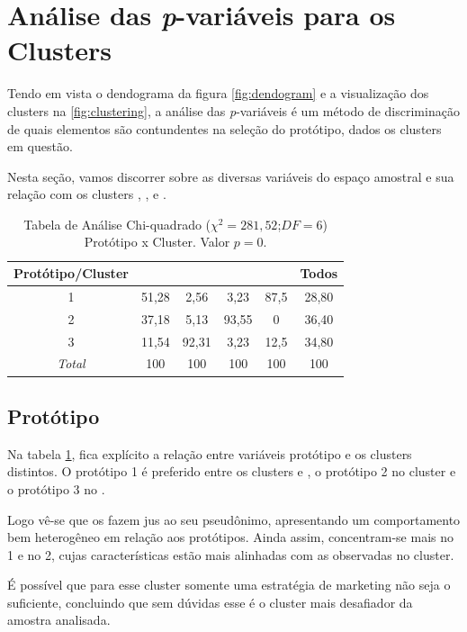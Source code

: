 \section{Análise das \emph{p}-variáveis para os Clusters}

Tendo em vista o dendograma da figura \ref{fig:dendogram} e a visualização dos
clusters na \ref{fig:clustering}, a análise das \emph{p}-variáveis é um método
de discriminação de quais elementos são contundentes na seleção do protótipo,
dados os clusters em questão. 

Nesta seção, vamos discorrer sobre as diversas variáveis do espaço
amostral e sua relação com os clusters \emph{\nomeCa{}}, \emph{\nomeCb{}}, \emph{\nomeCc{}}
e \emph{\nomeCd{}}.
\begin{table}
\begin{centering}
\begin{tabular}{c|c|c|c|c|c}
\hline 
Protótipo/Cluster & \nomeCa{} & \nomeCb{} & \nomeCc{} & \nomeCd{} & Todos\tabularnewline
\hline 
1 & 51,28 & 2,56 & 3,23 & 87,5 & 28,80\tabularnewline
\hline 
2 & 37,18 & 5,13 & 93,55 & 0 & 36,40\tabularnewline
\hline 
3 & 11,54 & 92,31 & 3,23 & 12,5 & 34,80\tabularnewline
\hline 
\emph{Total} & 100 & 100 & 100 & 100 & 100\tabularnewline
\hline 
\end{tabular}
\par\end{centering}

\caption{\label{tab:prototipo-vs-cluster}Tabela de Análise Chi-quadrado ($\chi^{2}=281,52$;$DF=6$)
Protótipo x Cluster. Valor $p=0$.}
\end{table}

\subsection{Protótipo}

Na tabela \ref{tab:prototipo-vs-cluster}, fica explícito a relação
entre variáveis protótipo e os clusters distintos. O protótipo 1 é
preferido entre os clusters \emph{\nomeCa{}} e \emph{\nomeCd{}},
o protótipo 2 no cluster \emph{\nomeCc{}} e o protótipo 3 no \emph{\nomeCb{}}.

Logo vê-se que os \emph{\nomeCa{}} fazem jus ao seu pseudônimo, apresentando
um comportamento bem heterogêneo em relação aos protótipos. Ainda
assim, concentram-se mais no 1 e no 2, cujas características estão
mais alinhadas com as observadas no cluster. 

É possível que para esse cluster somente uma estratégia de marketing
não seja o suficiente, concluindo que sem dúvidas esse é o cluster
mais desafiador da amostra analisada.

